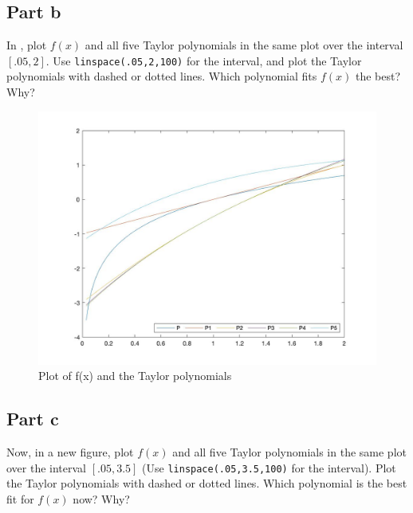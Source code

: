 \subsection{Part b}

\begin{question}
    In \MATLAB, plot $f(x)$ and all five Taylor polynomials in the same plot over the interval $[.05,2]$. Use \verb+linspace(.05,2,100)+ for the interval, and plot the Taylor polynomials with dashed or dotted lines. Which polynomial fits $f(x)$ the best? Why?
\end{question}

\begin{answer}
    \begin{figure}[H]
        \centering
        \includegraphics[width=1.0\textwidth]{Figure 3.jpg}
        \caption{\label{fig:fig3}Plot of f(x) and the Taylor polynomials}
    \end{figure}
\end{answer}

\subsection{Part c}

\begin{question}
    Now, in a new figure, plot $f(x)$ and all five Taylor polynomials in the same plot over the interval $[.05,3.5]$ (Use \verb+linspace(.05,3.5,100)+ for the interval). Plot the Taylor polynomials with dashed or dotted lines. Which polynomial is the best fit for $f(x)$ now? Why?
\end{question}

\begin{answer}
    
\end{answer}